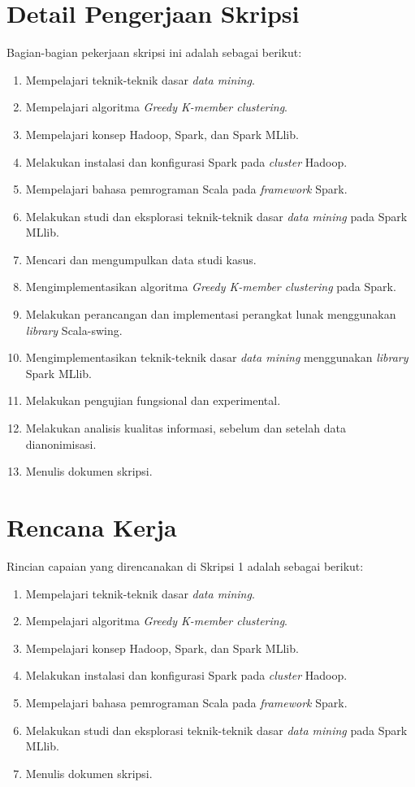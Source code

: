 \documentclass[a4paper,twoside]{article}
\begin{document}
\section{Detail Pengerjaan Skripsi}
Bagian-bagian pekerjaan skripsi ini adalah sebagai berikut:
\begin{enumerate}
\item Mempelajari teknik-teknik dasar {\it data mining}.
\item Mempelajari algoritma {\it Greedy K-member clustering}.
\item Mempelajari konsep Hadoop, Spark, dan Spark MLlib.
\item Melakukan instalasi dan konfigurasi Spark pada {\it cluster} Hadoop. 
\item Mempelajari bahasa pemrograman Scala pada {\it framework} Spark.
\item Melakukan studi dan eksplorasi teknik-teknik dasar {\it data mining} pada Spark MLlib.
\item Mencari dan mengumpulkan data studi kasus.
\item Mengimplementasikan algoritma {\it Greedy K-member clustering } pada Spark.
\item Melakukan perancangan dan implementasi perangkat lunak menggunakan {\it library} Scala-swing.
\item Mengimplementasikan teknik-teknik dasar {\it data mining} menggunakan {\it library}  Spark MLlib.
\item Melakukan pengujian fungsional dan experimental.
\item Melakukan analisis kualitas informasi, sebelum dan setelah data dianonimisasi.
\item Menulis dokumen skripsi.
\end{enumerate}

\section{Rencana Kerja}
Rincian capaian yang direncanakan di Skripsi 1 adalah sebagai berikut:
\begin{enumerate}
\item Mempelajari teknik-teknik dasar {\it data mining}.
\item Mempelajari algoritma {\it Greedy K-member clustering}.
\item Mempelajari konsep Hadoop, Spark, dan Spark MLlib. 
\item Melakukan instalasi dan konfigurasi Spark pada {\it cluster} Hadoop.
\item Mempelajari bahasa pemrograman Scala pada {\it framework} Spark.
\item Melakukan studi dan eksplorasi teknik-teknik dasar {\it data mining} pada Spark MLlib.
\item Menulis dokumen skripsi.
\end{enumerate}
\end{document}
